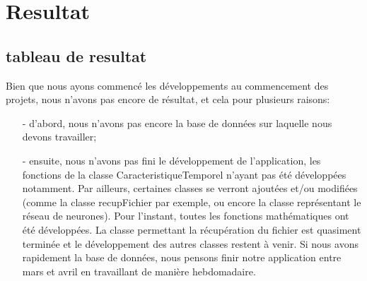  \part{Resultat} %
 \label{prt:resultat_}
 
	\chapter{tableau de resultat} %
		\label{chap:tableau_de_resultat}
		
		Bien que nous ayons commencé les développements au commencement des projets, nous n'avons pas encore de résultat, et cela pour plusieurs raisons:
		\begin{itemize}
			\item [-] d'abord, nous n'avons pas encore la base de données sur laquelle nous devons travailler;
			\item [-]ensuite, nous n'avons pas fini le développement de l'application, les fonctions de la classe CaracteristiqueTemporel n'ayant pas été développées notamment. Par ailleurs, certaines classes se verront ajoutées et/ou modifiées (comme la classe recupFichier par exemple, ou encore la classe représentant le réseau de neurones).
		Pour l'instant, toutes les fonctions mathématiques ont été développées. La classe permettant la récupération du fichier est quasiment terminée et le développement des autres classes restent à venir.
		Si nous avons rapidement la base de données, nous pensons finir notre application entre mars et avril en travaillant de manière hebdomadaire.
		\end{itemize}


